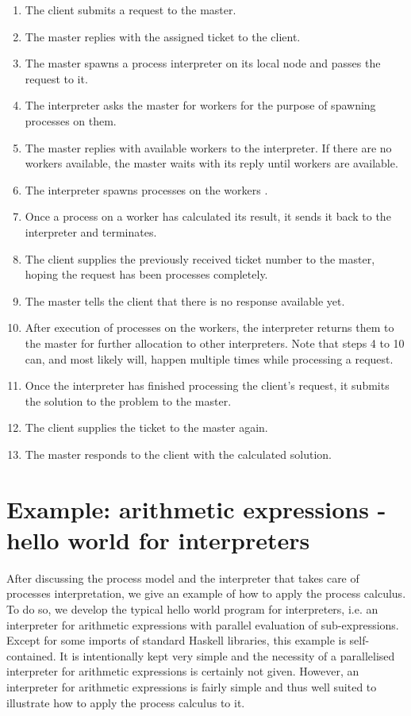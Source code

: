 \begin{enumerate}
  \item The client submits a request to the master.
  \item The master replies with the assigned ticket to the client.
  \item The master spawns a process interpreter on its local node and passes the request to it.
  \item The interpreter asks the master for workers for the purpose of spawning processes on them.
  \item The master replies with available workers to the interpreter. If there are no workers available, the master waits with its reply until workers are available.
  \item The interpreter spawns processes on the workers .
  \item Once a process on a worker has calculated its result, it sends it back to the interpreter and terminates.
  \item The client supplies the previously received ticket number to the master, hoping the request has been processes completely.
  \item The master tells the client that there is no response available yet.
  \item After execution of processes on the workers, the interpreter returns them to the master for further allocation to other interpreters. Note that steps 4 to 10 can, and most likely will, happen multiple times while processing a request.
  \item Once the interpreter has finished processing the client's request, it submits the solution to the problem to the master.
  \item The client supplies the ticket to the master again.
  \item The master responds to the client with the calculated solution.
\end{enumerate}

\section{Example: arithmetic expressions - hello world for interpreters}
\label{chp:example}
After discussing the process model and the interpreter that takes care of processes interpretation, we give an example of how to apply the process calculus. To do so, we develop the typical hello world program for interpreters, i.e. an interpreter for arithmetic expressions with parallel evaluation of sub-expressions. Except for some imports of standard \textsf{Haskell} libraries, this example is self-contained. It is intentionally kept very simple and the necessity of a parallelised interpreter for arithmetic expressions is certainly not given. However, an interpreter for arithmetic expressions is fairly simple and thus well suited to illustrate how to apply the process calculus to it.

